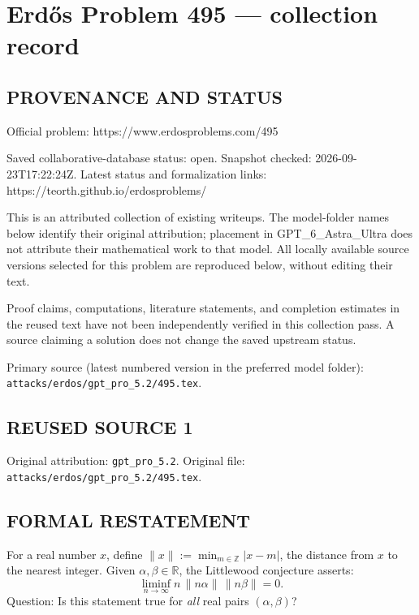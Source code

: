 \section*{Erd\H{o}s Problem 495 --- collection record}

\subsection*{PROVENANCE AND STATUS}
Official problem: https://www.erdosproblems.com/495

Saved collaborative-database status: open.
Snapshot checked: 2026-09-23T17:22:24Z.
Latest status and formalization links: https://teorth.github.io/erdosproblems/

This is an attributed collection of existing writeups. The model-folder names below identify their original attribution; placement in GPT\_6\_Astra\_Ultra does not attribute their mathematical work to that model. All locally available source versions selected for this problem are reproduced below, without editing their text.

Proof claims, computations, literature statements, and completion estimates in the reused text have not been independently verified in this collection pass. A source claiming a solution does not change the saved upstream status.

Primary source (latest numbered version in the preferred model folder): \texttt{attacks/erdos/gpt\_pro\_5.2/495.tex}.

\subsection*{REUSED SOURCE 1}
Original attribution: \texttt{gpt\_pro\_5.2}.
Original file: \texttt{attacks/erdos/gpt\_pro\_5.2/495.tex}.


\subsection*{FORMAL RESTATEMENT}
For a real number $x$, define $\|x\|:=\min_{m\in\mathbb{Z}}|x-m|$, the distance from $x$ to the nearest integer.
Given $\alpha,\beta\in\mathbb{R}$, the Littlewood conjecture asserts:
\[
\liminf_{n\to\infty} n\,\|n\alpha\|\,\|n\beta\| = 0.
\]
Question: Is this statement true for \emph{all} real pairs $(\alpha,\beta)$?

